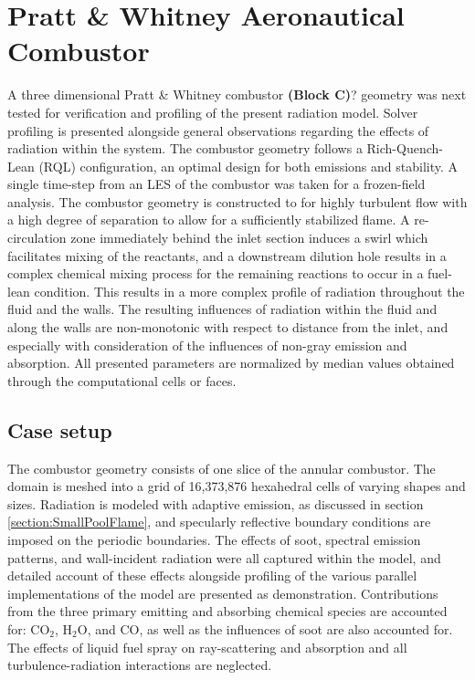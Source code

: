 \section{Pratt \& Whitney Aeronautical Combustor}
A three dimensional Pratt \& Whitney combustor \textbf{(Block C)}? geometry was next tested for verification and profiling of the present radiation model. Solver profiling is presented alongside general observations regarding the effects of radiation within the system.
The combustor geometry follows a Rich-Quench-Lean (RQL) configuration, an optimal design for both emissions and stability.
A single time-step from an LES of the combustor was taken for a frozen-field analysis. 
The combustor geometry is constructed to for highly turbulent flow with a high degree of separation to allow for a sufficiently stabilized flame.
A re-circulation zone immediately behind the inlet section induces a swirl which facilitates mixing of the reactants, and a downstream dilution hole results in a complex chemical mixing process for the remaining reactions to occur in a fuel-lean condition. This results in a more complex profile of radiation throughout the fluid and the walls.
The resulting influences of radiation within the fluid and along the walls are non-monotonic with respect to distance from the inlet, and especially with consideration of the influences of non-gray emission and absorption. 
All presented parameters are normalized by median values obtained through the computational cells or faces.


\subsection{Case setup}
The combustor geometry consists of one slice of the annular combustor. The domain is meshed into a grid of 16,373,876 hexahedral cells of varying shapes and sizes. 
Radiation is modeled with adaptive emission, as discussed in section \ref{section:SmallPoolFlame}, and specularly reflective boundary conditions are imposed on the periodic boundaries.
The effects of soot, spectral emission patterns, and wall-incident radiation were all captured within the model, and detailed account of these effects alongside profiling of the various parallel implementations of the model are presented as demonstration.
Contributions from the three primary emitting and absorbing chemical species are accounted for: CO$_2$, H$_2$O, and CO, as well as the influences of soot are also accounted for.
The effects of liquid fuel spray on ray-scattering and absorption and all turbulence-radiation interactions are neglected.

